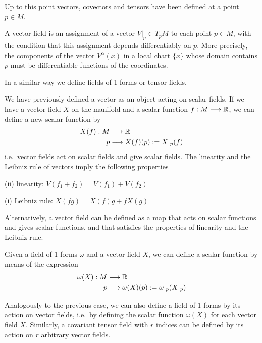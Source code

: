 \begin{points}
\item Up to this point vectors, covectors and tensors have been defined at a point $p\in M$.

\item A vector field is an assignment of a vector $V|_p\in T_pM$ to each point $p\in M$, with the condition that this assignment depends differentiably on $p$. More precisely, the components of the vector $V^\alpha(x)$ in a local chart $\{x\}$ whose domain contains $p$ must be differentiable functions of the coordinates.

\item In a similar way we define fields of 1-forms or tensor fields.

\item We have previously defined a vector as an object acting on scalar fields. If we have a vector field $X$ on the manifold and a scalar function $f:M\longrightarrow\mathbb{R}$, we can define a new scalar function by
\begin{align*}
  X(f):M&\longrightarrow\mathbb{R}\\
  p&\longrightarrow X(f)(p):=X|_p(f)
\end{align*}
i.e.\ vector fields act on scalar fields and give scalar fields. The linearity and the Leibniz rule of vectors imply the following properties

(ii) linearity: $V(f_1+f_2)=V(f_1)+V(f_2)$

(i) Leibniz rule: $X(fg)=X(f)g+fX(g)$

\item Alternatively, a vector field can be defined as a map that acts on scalar functions and gives scalar functions, and that satisfies the properties of linearity and the Leibniz rule.

\item Given a field of 1-forms $\omega$ and a vector field $X$, we can define a scalar function by means of the expression
\begin{align*}
  \omega(X):M&\longrightarrow\mathbb{R}\\
  p&\longrightarrow\omega(X)(p):=\omega|_p(X|_p)
\end{align*}

\item Analogously to the previous case, we can also define a field of 1-forms by its action on vector fields, i.e.\ by defining the scalar function $\omega(X)$ for each vector field $X$. Similarly, a covariant tensor field with $r$ indices can be defined by its action on $r$ arbitrary vector fields.


\end{points}
